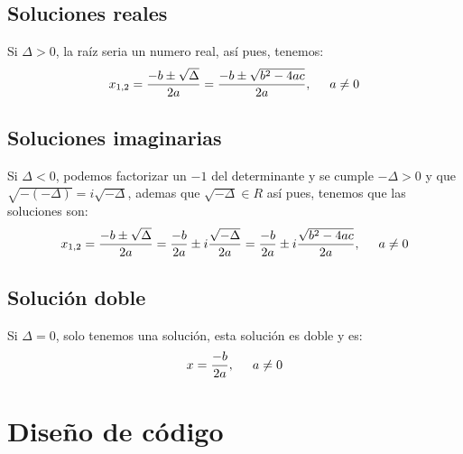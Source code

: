\documentclass{article}
\begin{document}
\begin{multicols}{2}
		\subsection{Soluciones reales}
			Si $\Delta>0$, la raíz seria un numero real, así pues, tenemos:
			$$x_{1,2}=\frac{-b\pm\sqrt{\Delta}}{2a}=\frac{-b\pm\sqrt{b^2-4ac}}{2a},\hspace{0.5cm}a\neq0$$

		\subsection{Soluciones imaginarias}
			Si $\Delta<0$, podemos factorizar un $-1$ del determinante y se cumple $-\Delta>0$ y que 
			$\sqrt{-(-\Delta)}=i\sqrt{-\Delta}$, ademas que $\sqrt{-\Delta}\in R$
			así pues, tenemos que las soluciones son:
			$$x_{1,2}=\frac{-b\pm\sqrt{\Delta}}{2a}=\frac{-b}{2a}\pm{i}\frac{\sqrt{-\Delta}}{2a}=\frac{-b}{2a}\pm{i}\frac{\sqrt{b^2-4ac}}{2a},\hspace{0.5cm}a\neq0$$

		\subsection{Solución doble}
			Si $\Delta=0$, solo tenemos una solución, esta solución es doble y es:
			$$x=\frac{-b}{2a},\hspace{0.5cm}a\neq0$$

	\end{multicols}

	\section{Diseño de código }

	
	\newpage
\end{document}
